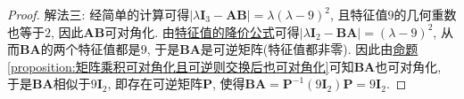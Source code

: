 \documentclass[../../main.tex]{subfiles}
\begin{document}
\begin{proof}
{\color{blue}解法三:}
经简单的计算可得\(|\lambda\boldsymbol{I}_3 - \boldsymbol{A}\boldsymbol{B}| = \lambda(\lambda - 9)^2\), 且特征值\(9\)的几何重数也等于\(2\), 因此\(\boldsymbol{A}\boldsymbol{B}\)可对角化. 由\hyperref[theorem:特征值的降价公式]{特征值的降价公式}可得\(|\lambda\boldsymbol{I}_2 - \boldsymbol{B}\boldsymbol{A}| = (\lambda - 9)^2\), 从而\(\boldsymbol{B}\boldsymbol{A}\)的两个特征值都是\(9\), 于是\(\boldsymbol{B}\boldsymbol{A}\)是可逆矩阵(特征值都非零). 因此由\hyperref[proposition:矩阵乘积可对角化且可逆则交换后也可对角化]{命题\ref{proposition:矩阵乘积可对角化且可逆则交换后也可对角化}}可知\(\boldsymbol{B}\boldsymbol{A}\)也可对角化, 于是\(\boldsymbol{B}\boldsymbol{A}\)相似于\(9\boldsymbol{I}_2\), 即存在可逆矩阵\(\boldsymbol{P}\), 使得\(\boldsymbol{B}\boldsymbol{A} = \boldsymbol{P}^{-1}(9\boldsymbol{I}_2)\boldsymbol{P} = 9\boldsymbol{I}_2\). 

\end{proof}
\end{document}
